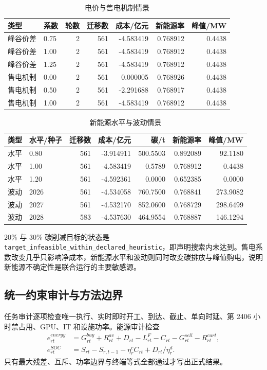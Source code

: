\documentclass[withoutpreface,bwprint]{cumcmthesis}
\begin{document}
\begin{table}[H]\centering
{\small
\caption{电价与售电机制情景}\label{tab:q4price}
\begin{tabular}{llrrrrr}\toprule
类型 & 系数 & 轮数 & 迁移数 & 成本/亿元 & 新能源率 & 峰值/MW\\\midrule
峰谷价差 & 0.75 & 2 & 561 & -4.583419 & 0.768912 & 0.4438\\
峰谷价差 & 1.00 & 2 & 561 & -4.583419 & 0.768912 & 0.4438\\
峰谷价差 & 1.25 & 2 & 561 & -4.583419 & 0.768912 & 0.4438\\
售电机制 & 0.00 & 2 & 561 & 0.000005 & 0.768926 & 0.4438\\
售电机制 & 0.50 & 2 & 561 & -2.291688 & 0.768917 & 0.4438\\
售电机制 & 1.00 & 2 & 561 & -4.583419 & 0.768912 & 0.4438\\\bottomrule
\end{tabular}
}
\end{table}

\begin{table}[H]\centering
{\small
\caption{新能源水平与波动情景}\label{tab:q4renewable}
\begin{tabular}{llrrrrr}\toprule
类型 & 水平/种子 & 迁移数 & 成本/亿元 & 碳/t & 新能源率 & 峰值/MW\\\midrule
水平 & 0.80 & 561 & -3.914911 & 500.5503 & 0.892089 & 92.1180\\
水平 & 1.00 & 561 & -4.583419 & 0.5789 & 0.768912 & 0.4438\\
水平 & 1.20 & 561 & -4.592361 & 0.0000 & 0.652385 & 0.0000\\
波动 & 2026 & 561 & -4.534058 & 760.7500 & 0.768841 & 273.9082\\
波动 & 2027 & 561 & -4.532170 & 852.0600 & 0.768729 & 298.6499\\
波动 & 2028 & 583 & -4.537630 & 464.9554 & 0.768887 & 146.1294\\\bottomrule
\end{tabular}
}
\end{table}

20\% 与 30\% 碳削减目标的状态是 \texttt{target\_infeasible\_within\_declared\_heuristic}，即声明搜索内未达到。售电系数改变几乎只影响净成本，新能源水平和波动则同时改变碳排放与峰值购电，说明新能源不确定性是联合运行的主要敏感源。

\subsection{统一约束审计与方法边界}
任务审计逐项检查唯一执行、实时即时开工、到达、截止、单向时延、第 2406 小时禁占用、GPU、IT 和设施功率。能源审计检查
\begin{align}
e^{energy}_{rt}&=G^{buy}_{rt}+R^{av}_{rt}+D_{rt}-L^F_{rt}-C_{rt}-G^{sell}_{rt}-R^{curt}_{rt},\\
e^{SOC}_{rt}&=S_{rt}-S_{r,t-1}-\eta_r^cC_{rt}+D_{rt}/\eta_r^d.
\end{align}
只有最大残差、互斥、功率边界与终端等式全部通过才写出正式结果。
\end{document}
